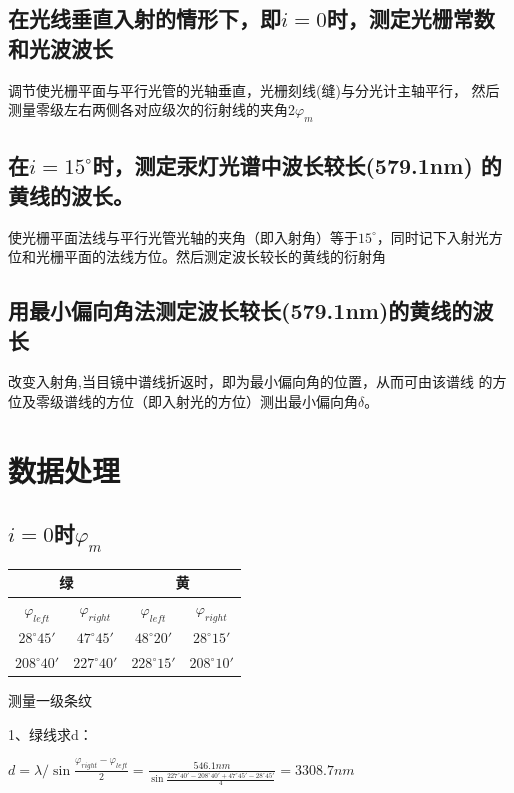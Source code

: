 \documentclass{ctexart}
\begin{document}
    \subsection{在光线垂直入射的情形下，即$i=0$时，测定光栅常数和光波波长}
    调节使光栅平面与平行光管的光轴垂直，光栅刻线(缝)与分光计主轴平行，
    然后测量零级左右两侧各对应级次的衍射线的夹角$2\varphi _m$
    \subsection{在$i=15^{\circ}$时，测定汞灯光谱中波长较长(579.1nm)
    的黄线的波长。}
    使光栅平面法线与平行光管光轴的夹角（即入射角）等于$15^{\circ}$，同时记下入射光方
位和光栅平面的法线方位。然后测定波长较长的黄线的衍射角
    \subsection{用最小偏向角法测定波长较长(579.1nm)的黄线的波长}
      改变入射角,当目镜中谱线折返时，即为最小偏向角的位置，从而可由该谱线
      的方位及零级谱线的方位（即入射光的方位）测出最小偏向角$\delta$。

\section{数据处理}
  \subsection{$i=0$时$\varphi_m$}
  \begin{table}[h]
    \centering
    \begin{tabular}{c|c|c|c}
      \hline
      \multicolumn{2}{c|}{绿} & \multicolumn{2}{c}{黄} \\
      \hline
      $\varphi_{left}$ & $\varphi_{right}$ & $\varphi_{left}$ & $\varphi_{right}$\\
      \hline
      $28^{\circ}45'$&$47^{\circ}45'$&$48^{\circ}20'$& $28^{\circ}15'$\\
      \hline
      $208^{\circ}40'$&$227^{\circ}40'$&$228^{\circ}15'$&$208^{\circ}10'$\\
    \end{tabular}
  \end{table}
    测量一级条纹

    1、绿线求d：
    
    $d=\lambda / \sin{\frac{\varphi_{right}-\varphi_{left}}{2}} 
    =\frac {546.1nm} {\sin{\frac{227^{\circ}40'-208^{\circ}40'+47^{\circ}45'-28^{\circ}45'}{4}}}
    =3308.7nm$
\end{document}
